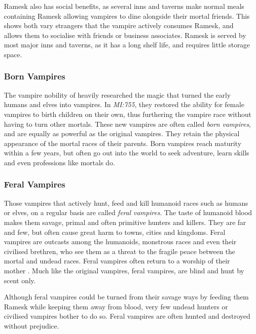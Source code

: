 Ramesk also has social benefits, as several inns and taverns make normal meals
containing Ramesk allowing vampires to dine alongside their mortal friends.
This shows both vary strangers that the vampire actively consumes Ramesk, and
allows them to socialise with friends or business associates. Ramesk is served
by most major inns and taverns, as it has a long shelf life, and requires
little storage space.

\subsubsection{Born Vampires}
\label{sec:Born Vampires}

The vampire nobility of  heavily researched the magic
that turned the early humans and elves into vampires. In \emph{MI:755}, they
restored the ability for female vampires to birth children on their own, thus
furthering the vampire race without having to turn other mortals. These new
vampires are often called \emph{born vampires}, and are equally as powerful
as the original vampires. They retain the physical appearance of the mortal
races of their parents. Born vampires reach maturity within a few years, but
often go out into the world to seek adventure, learn skills and even
professions like mortals do.

\subsubsection{Feral Vampires}
\label{sec:Feral Vampires}

Those vampires that actively hunt, feed and kill humanoid races such as
humans or elves, on a regular basis are called \emph{feral vampires}. The
taste of humanoid blood makes them savage, primal and often primitive hunters
and killers. They are far and few, but often cause great harm to towns, cities
and kingdoms. Feral vampires are outcasts among the humanoids, monstrous races
and even their civilised brethren, who see them as a threat to the fragile
peace between the mortal and undead races. Feral vampires often return to a
worship of their mother . Much like the original vampires,
feral vampires, are blind and hunt by scent only.

Although feral vampires could be turned from their savage ways by feeding them
Ramesk while keeping them away from blood, very few undead hunters or
civilised vampires bother to do so. Feral vampires are often hunted and
destroyed without prejudice.

